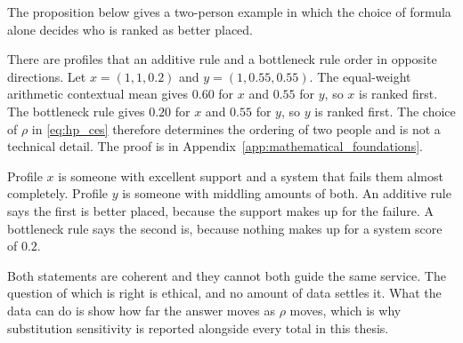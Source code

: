 The proposition below gives a two-person example in which the choice of formula alone decides who is ranked as better placed.

\begin{proposition}
\label{prop:lit-reversal}
There are profiles that an additive rule and a bottleneck rule order in
opposite directions. Let $x=(1,1,0.2)$ and $y=(1,0.55,0.55)$. The equal-weight
arithmetic contextual mean gives $0.60$ for $x$ and $0.55$ for $y$, so $x$ is
ranked first. The bottleneck rule gives $0.20$ for $x$ and $0.55$ for $y$, so
$y$ is ranked first. The choice of $\rho$ in \eqref{eq:hp_ces} therefore
determines the ordering of two people and is not a technical detail. The proof
is in Appendix~\ref{app:mathematical_foundations}.
\end{proposition}

\begin{reading}
Profile $x$ is someone with excellent support and a system that fails them
almost completely. Profile $y$ is someone with middling amounts of both. An
additive rule says the first is better placed, because the support makes up for
the failure. A bottleneck rule says the second is, because nothing makes up for
a system score of $0.2$.

Both statements are coherent and they cannot both guide the same service. The
question of which is right is ethical, and no amount of data settles it. What
the data can do is show how far the answer moves as $\rho$ moves, which is why
substitution sensitivity is reported alongside every total in this thesis.
\end{reading}

